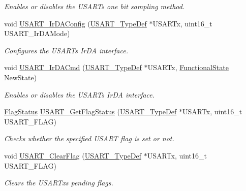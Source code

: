 \begin{DoxyCompactItemize}
\begin{DoxyCompactList}\small\item\em Enables or disables the U\+S\+A\+RT\textquotesingle{}s one bit sampling method. \end{DoxyCompactList}\item 
void \hyperlink{group___u_s_a_r_t___private___functions_ga81a0cd36199040bf6d266b57babd678e}{U\+S\+A\+R\+T\+\_\+\+Ir\+D\+A\+Config} (\hyperlink{struct_u_s_a_r_t___type_def}{U\+S\+A\+R\+T\+\_\+\+Type\+Def} $\ast$U\+S\+A\+R\+Tx, uint16\+\_\+t U\+S\+A\+R\+T\+\_\+\+Ir\+D\+A\+Mode)
\begin{DoxyCompactList}\small\item\em Configures the U\+S\+A\+RT\textquotesingle{}s Ir\+DA interface. \end{DoxyCompactList}\item 
void \hyperlink{group___u_s_a_r_t___private___functions_gabff56ebb494fdfadcc6ef4fe9ac8dd24}{U\+S\+A\+R\+T\+\_\+\+Ir\+D\+A\+Cmd} (\hyperlink{struct_u_s_a_r_t___type_def}{U\+S\+A\+R\+T\+\_\+\+Type\+Def} $\ast$U\+S\+A\+R\+Tx, \hyperlink{group___exported__types_gac9a7e9a35d2513ec15c3b537aaa4fba1}{Functional\+State} New\+State)
\begin{DoxyCompactList}\small\item\em Enables or disables the U\+S\+A\+RT\textquotesingle{}s Ir\+DA interface. \end{DoxyCompactList}\item 
\hyperlink{group___exported__types_ga89136caac2e14c55151f527ac02daaff}{Flag\+Status} \hyperlink{group___u_s_a_r_t___private___functions_ga144630722defc9e312f0ad280b68e9da}{U\+S\+A\+R\+T\+\_\+\+Get\+Flag\+Status} (\hyperlink{struct_u_s_a_r_t___type_def}{U\+S\+A\+R\+T\+\_\+\+Type\+Def} $\ast$U\+S\+A\+R\+Tx, uint16\+\_\+t U\+S\+A\+R\+T\+\_\+\+F\+L\+AG)
\begin{DoxyCompactList}\small\item\em Checks whether the specified U\+S\+A\+RT flag is set or not. \end{DoxyCompactList}\item 
void \hyperlink{group___u_s_a_r_t___private___functions_gad962e148fc466ae1b45b288f6c91d966}{U\+S\+A\+R\+T\+\_\+\+Clear\+Flag} (\hyperlink{struct_u_s_a_r_t___type_def}{U\+S\+A\+R\+T\+\_\+\+Type\+Def} $\ast$U\+S\+A\+R\+Tx, uint16\+\_\+t U\+S\+A\+R\+T\+\_\+\+F\+L\+AG)
\begin{DoxyCompactList}\small\item\em Clears the U\+S\+A\+R\+Tx\textquotesingle{}s pending flags. \end{DoxyCompactList}\item 

\end{DoxyCompactItemize}
